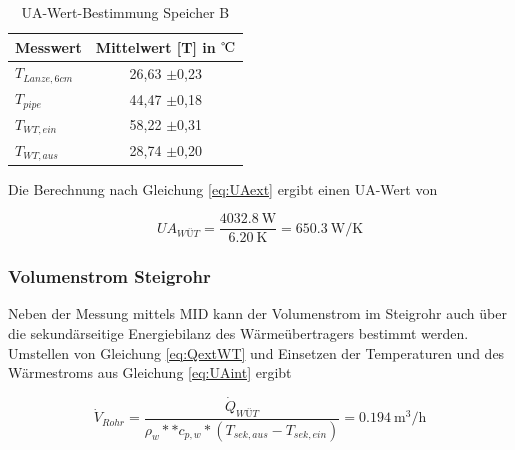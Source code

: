 \begin{table}[H]
	\centering
	
	\begin{tabular}{l|c}
		
		
		\textbf{Messwert} & \textbf{Mittelwert} [T] in ${\celsius}$\\
		\hline
		$T_{Lanze,6cm}$ & 26,63 $\pm$0,23\\
		$T_{pipe}$ & 44,47 $\pm$0,18\\
		$T_{WT,ein}$ & 58,22 $\pm$0,31\\
		$T_{WT,aus}$ & 28,74 $\pm$0,20\\
	
		
	\end{tabular}
\caption[UA-Wert-Bestimmung Speicher B]{UA-Wert-Bestimmung Speicher B}
\label{tab:intWT}
\end{table}

Die Berechnung nach Gleichung \ref{eq:UAext} ergibt einen UA-Wert von

\begin{equation}
	\label{eq:UAint}
		UA_{WÜT} = \frac{\SI{4032,8}{\watt}}{\SI{6,20}{\kelvin}} = \SI{650,3}{\watt\per\kelvin}
\end{equation}

\subsubsection{Volumenstrom Steigrohr}
Neben der Messung mittels MID kann der Volumenstrom im Steigrohr auch über die sekundärseitige Energiebilanz des Wärmeübertragers bestimmt werden. Umstellen von Gleichung \ref{eq:QextWT} und Einsetzen der Temperaturen und des Wärmestroms aus Gleichung \ref{eq:UAint} ergibt

\begin{equation}
	\label{eq:Vdot}
	\dot V_{Rohr}  =\frac{\dot Q_{WÜT}}{\rho_{w} *  * c_{p,w} * (T_{sek,aus}-T_{sek,ein})}  = \SI{0,194}{\cubic\meter\per\hour}
\end{equation}


